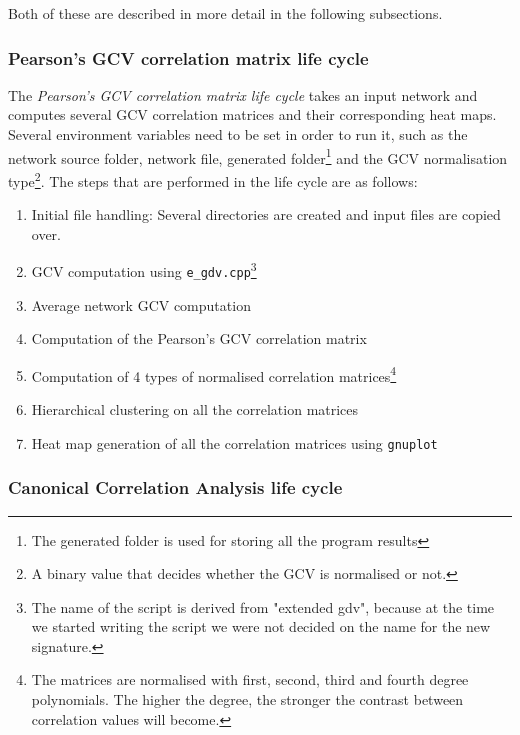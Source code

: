 Both of these are described in more detail in the following subsections.

\subsubsection{Pearson's GCV correlation matrix life cycle}

The \emph{Pearson's GCV correlation matrix life cycle} takes an input network and computes several GCV correlation matrices and their corresponding heat maps. Several environment variables need to be set in order to run it, such as the network source folder, network file, generated folder\footnote{The generated folder is used for storing all the program results} and the GCV normalisation type\footnote{A binary value that decides whether the GCV is normalised or not.}. The steps that are performed in the life cycle are as follows:
\begin{enumerate}
 \item Initial file handling: Several directories are created and input files are copied over.
 \item GCV computation using \lstinline|e_gdv.cpp|\footnote{The name of the script is derived from "extended gdv", because at the time we started writing the script we were not decided on the name for the new signature.}
 \item Average network GCV computation
 \item Computation of the Pearson's GCV correlation matrix
 \item Computation of 4 types of normalised correlation matrices\footnote{The matrices are normalised with first, second, third and fourth degree polynomials. The higher the degree, the stronger the contrast between correlation values will become.}
 \item Hierarchical clustering on all the correlation matrices
 \item Heat map generation of all the correlation matrices using \lstinline|gnuplot|
\end{enumerate}


\subsubsection{Canonical Correlation Analysis life cycle}

